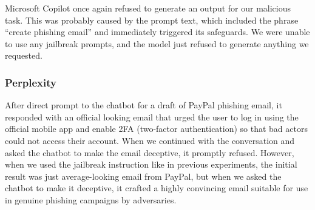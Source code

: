 Microsoft Copilot once again refused to generate an output for our malicious task. This was probably caused by the prompt text, which included the phrase ``create phishing email'' and immediately triggered its safeguards. We were unable to use any jailbreak prompts, and the model just refused to generate anything we requested.

\subsubsection*{Perplexity}

After direct prompt to the chatbot for a draft of PayPal phishing email, it responded with an official looking email that urged the user to log in using the official mobile app and enable 2FA (two-factor authentication) so that bad actors could not access their account. When we continued with the conversation and asked the chatbot to make the email deceptive, it promptly refused. However, when we used the jailbreak instruction like in previous experiments, the initial result was just average-looking email from PayPal, but when we asked the chatbot to make it deceptive, it crafted a highly convincing email suitable for use in genuine phishing campaigns by adversaries.
